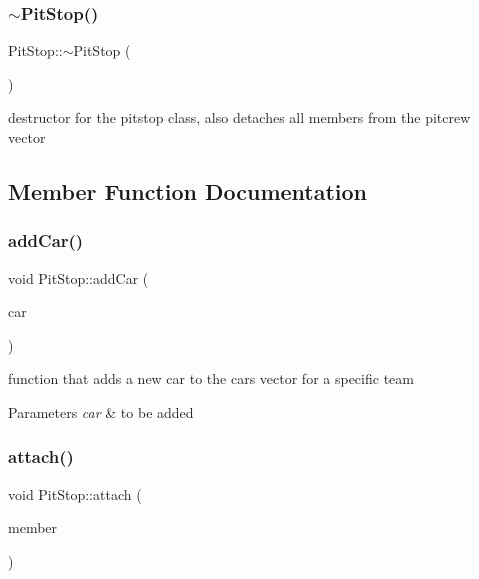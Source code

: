 \subsubsection{\texorpdfstring{$\sim$\+Pit\+Stop()}{~PitStop()}}
{\footnotesize\ttfamily Pit\+Stop\+::$\sim$\+Pit\+Stop (\begin{DoxyParamCaption}{ }\end{DoxyParamCaption})}

destructor for the pitstop class, also detaches all members from the pitcrew vector 

\subsection{Member Function Documentation}
\mbox{\label{class_pit_stop_a1e7fe0a405a2ba73c299bb5b05f19fc0}} 
\subsubsection{\texorpdfstring{add\+Car()}{addCar()}}
{\footnotesize\ttfamily void Pit\+Stop\+::add\+Car (\begin{DoxyParamCaption}\item[{\mbox{\hyperlink{class_car}{Car}} $\ast$}]{car }\end{DoxyParamCaption})\hspace{0.3cm}{\ttfamily [virtual]}}

function that adds a new car to the cars vector for a specific team 
\begin{DoxyParams}{Parameters}
{\em car} & to be added \\
\hline
\end{DoxyParams}
\mbox{\label{class_pit_stop_abf17df574e761dd36eb52d27c761ed43}} 
\subsubsection{\texorpdfstring{attach()}{attach()}}
{\footnotesize\ttfamily void Pit\+Stop\+::attach (\begin{DoxyParamCaption}\item[{\mbox{\hyperlink{class_pit_crew}{Pit\+Crew}} $\ast$}]{member }\end{DoxyParamCaption})}

